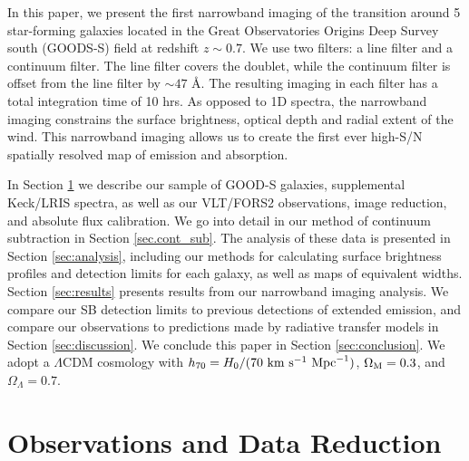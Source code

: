 \documentclass[twocolumn]{aastex61}
\begin{document}
In this paper, we present the first narrowband imaging of the  transition around 5 star-forming  galaxies located in the Great Observatories Origins Deep Survey south (GOODS-S) field at redshift $z \sim 0.7$. 
We use two filters: a line filter and a continuum filter. The line filter covers the  doublet, while the continuum filter is offset from the line filter by ${\sim}47$ \AA.    
The resulting imaging in each filter has a total integration time of 10 hrs.
As opposed to 1D spectra, the narrowband imaging constrains the surface brightness, optical depth and radial extent of the wind. This narrowband imaging allows us to create the first ever high-S/N spatially resolved map of  emission and absorption. 

In Section \ref{sec:obs_red} we describe our sample of GOOD-S galaxies, supplemental Keck/LRIS spectra, as well as our VLT/FORS2 observations, image reduction, and absolute flux calibration. We go into detail in our method of continuum subtraction in Section \ref{sec.cont_sub}. The analysis of these data is presented in Section \ref{sec:analysis}, 
including our methods for calculating surface brightness profiles and detection limits for each galaxy, as well as maps of  equivalent widths.
Section \ref{sec:results} presents results from our narrowband imaging analysis. We compare our SB detection limits to previous detections of extended  emission,  and compare our observations to predictions made by radiative transfer models in Section \ref{sec:discussion}. We conclude this paper in Section \ref{sec:conclusion}.
We adopt a $\Lambda$CDM cosmology with $h_{70} = H_0/(70\ \rm{ km}\ \rm{ s}^{-1}\ \rm{ Mpc}^{-1})$, $\Omega_{\rm{M}}= 0.3$, and $\Omega_{\Lambda} = 0.7$.


\section{Observations and Data Reduction}\label{sec:obs_red}
\end{document}
